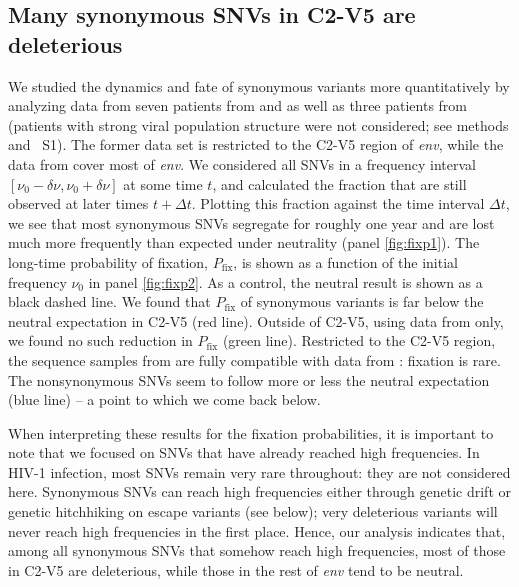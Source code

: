 \documentclass[11pt]{article}
\newcommand{\pfix}{P_{\mathrm{fix}}}
\newcommand{\env}{\textit{env}}
\newcommand{\shankaregion}{C2-V5}
\newcommand{\PCApat}{1}
\begin{document}
\subsection*{Many synonymous SNVs in \shankaregion{} are deleterious}
We studied the dynamics and fate of synonymous variants more quantitatively by
analyzing data from seven patients from \citet{shankarappa_consistent_1999} and
\citet{liu_selection_2006} as well as three patients from
\citet{bunnik_autologous_2008} (patients with strong viral population structure
were not considered; see methods and \figurename~S\PCApat). The
former data set is restricted to the \shankaregion{} region of \env, while the
data from \citet{bunnik_autologous_2008} cover most of \env.  We considered all
SNVs in a frequency interval $[\nu_0-\delta\nu, \nu_0+\delta\nu]$ at some time
$t$, and calculated the fraction that are still observed at later times $t+\Delta
t$. Plotting this fraction against the time interval $\Delta t$, we see that
most synonymous SNVs segregate for roughly one year and are lost much more
frequently than expected under neutrality (panel \ref{fig:fixp1}). The long-time
probability of fixation, $\pfix$, is shown as a function of the initial
frequency $\nu_0$ in panel \ref{fig:fixp2}. As a control, the neutral result is
shown as a black dashed line. We found that $\pfix$ of synonymous
variants is far below the neutral expectation in \shankaregion{} (red line).
Outside of \shankaregion, using data from \citet{bunnik_autologous_2008} only,
we found no such reduction in $\pfix$ (green line). Restricted to the
\shankaregion{} region, the sequence samples from \citet{bunnik_autologous_2008}
are fully compatible with data from \citet{shankarappa_consistent_1999}:
fixation is rare. The
nonsynonymous SNVs seem to follow more or less the neutral expectation (blue
line) -- a point to which we come back below.

When interpreting these results for the fixation probabilities, it is important
to note that we focused on SNVs that have already reached high frequencies. In
HIV-1 infection, most SNVs remain very rare throughout: they are not considered
here. Synonymous SNVs can reach high frequencies either through genetic
drift or genetic hitchhiking on escape variants (see below); very deleterious
variants will never reach high frequencies in the first place. Hence, our
analysis indicates that, among all synonymous SNVs that somehow reach high
frequencies, most of those in \shankaregion{} are deleterious, while
those in the rest of \env{} tend to be neutral.
\end{document}
